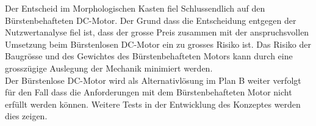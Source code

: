 \documentclass[../../../main.tex]{subfiles}
\begin{document}
    Der Entscheid im Morphologischen Kasten fiel Schlussendlich auf den Bürstenbehafteten DC-Motor. Der Grund dass die Entscheidung entgegen der Nutzwertanalyse fiel ist, dass der grosse Preis zusammen mit der anspruchsvollen Umsetzung beim Bürstenlosen DC-Motor ein zu grosses Risiko ist. Das Risiko der Baugrösse und des Gewichtes des Bürstenbehafteten Motors kann durch eine grosszügige Auslegung der Mechanik minimiert werden.\\
    Der Bürstenlose DC-Motor wird als Alternativlösung im Plan B weiter verfolgt für den Fall dass die Anforderungen mit dem Bürstenbehafteten Motor nicht erfüllt werden können. Weitere Tests in der Entwicklung des Konzeptes werden dies zeigen.

    
\end{document}
